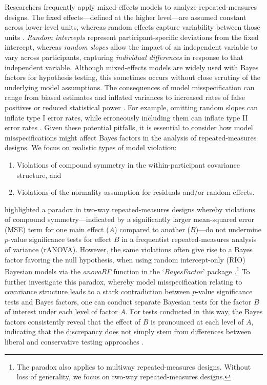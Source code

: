 \documentclass[preprint,12pt,authoryear]{elsarticle}
\begin{document}
Researchers frequently apply mixed-effects models to analyze repeated-measures designs. The fixed effects—defined at the higher level—are assumed constant across lower-level units, whereas random effects capture variability between those units \citep{dong_banova_2017,gelman_analysis_2005,verissimo_when_2023}. \textit{Random intercepts} represent participant-specific deviations from the fixed intercept, whereas \textit{random slopes} allow the impact of an independent variable to vary across participants, capturing \textit{individual differences} in response to that independent variable. Although mixed-effects models are widely used with Bayes factors for hypothesis testing, this sometimes occurs without close scrutiny of the underlying model assumptions. The consequences of model misspecification can range from biased estimates and inflated variances to increased rates of false positives or reduced statistical power \citep{golden_making_1995,golden_statistical_2000,gustafson_measuring_2001,iachine_robust_2010,toyama_biases_2019}. For example, omitting random slopes can inflate type I error rates, while erroneously including them can inflate type II error rates \citep{lebeau_model_2018,oberauer_importance_2022,van_doorn_bayes_2023}. Given these potential pitfalls, it is essential to consider how model misspecifications might affect Bayes factors in the analysis of repeated-measures designs. We focus on realistic types of model violation:
\begin{enumerate}
	\item Violations of compound symmetry in the within-participant covariance structure, and
	\item Violations of the normality assumption for residuals and/or random effects.
\end{enumerate}

\citet[p.~80]{bub_motor_2021} highlighted a paradox in two-way repeated-measures designs whereby violations of compound symmetry—indicated by a significantly larger mean-squared error (MSE) term for one main effect ($A$) compared to another ($B$)—do not undermine $p$-value significance tests for effect $B$ in a frequentist repeated-measures analysis of variance (rANOVA). However, the same violations often give rise to a Bayes factor favoring the null hypothesis, when using random intercept-only (RIO) Bayesian models via the \textit{anovaBF} function in the `\textit{BayesFactor}' package \citep[version 0.9.12-4.7 as of this writing;][]{morey_bayesfactor_2024}.\footnote[1]{The paradox also applies to multiway repeated-measures designs. Without loss of generality, we focus on two-way repeated-measures designs.} To further investigate this paradox, whereby model misspecification relating to covariance structure leads to a stark contradiction between $p$-value significance tests and Bayes factors, one can conduct separate Bayesian tests for the factor $B$ of interest under each level of factor $A$. For tests conducted in this way, the Bayes factors consistently reveal that the effect of $B$ is pronounced at each level of $A$, indicating that the discrepancy does not simply stem from differences between liberal and conservative testing approaches \citep{ly_harold_2016,nathoo_bayesian_2016,raftery_bayesian_1995,wei_investigating_2023,wetzels_statistical_2011}.
\end{document}
